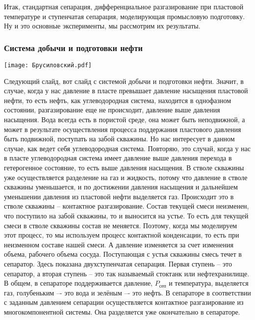 \documentclass[main.tex]{subfiles}
\begin{document}
Итак, стандартная сепарация, дифференциальное разгазирование при пластовой температуре и ступенчатая сепарация, моделирующая промысловую подготовку.
Ну и это основные эксперименты, мы рассмотрим их результаты.

\subsubsection{Система добычи и подготовки нефти}

\begin{center}
\texttt{[image: Брусиловский.pdf]}
\end{center}

Следующий слайд, вот слайд с системой добычи и подготовки нефти.
Значит, в случае, когда у нас давление в пласте превышает давление насыщения пластовой нефти, то есть нефть, как углеводородная система, находится в однофазном состоянии, разгазирование еще не происходит, давление выше давления насыщения.
Вода всегда есть в пористой среде, она может быть неподвижной, а может в результате осуществления процесса поддержания пластового давления быть подвижной, поступать на забой скважины.
Но нас интересует в данном случае, как ведет себя углеводородная система.
Повторяю, это случай, когда у нас в пласте углеводородная система имеет давление выше давления перехода в гетерогенное состояние, то есть выше давления насыщения.
В стволе скважины уже осуществляется разделение на газ и жидкость, потому что давление в стволе скважины уменьшается, и по достижении давления насыщения и дальнейшем уменьшении давления из пластовой нефти выделяется газ.
Происходит это в стволе скважины -- контактное разгазирование.
Состав текущей смеси неизменен, что поступило на забой скважины, то и выносится на устье.
То есть для текущей смеси в стволе скважины состав не меняется.
Поэтому, когда мы моделируем этот процесс, то мы используем процесс контактной конденсации, то есть при неизменном составе нашей смеси.
А давление изменяется за счет изменения объема, рабочего объема сосуда.
Поступающая с устья скважины смесь течет в сепаратор.
Здесь показана двухступенчатая сепарация.
Первая ступень -- это сепаратор, а вторая ступень -- это так называемый стоктанк или нефтехранилище.
В общем, в сепараторе поддерживается давление, $P_{\text{сеп}}$ и температура, выделяется газ, голубеньким –- это вода и зелёным –- это нефть.
В сепараторе в соответствии с заданным давлением сепарации осуществляется контактное разгазирование из многокомпонентной системы.
Она разделяется уже окончательно в сепараторе.
\end{document}
